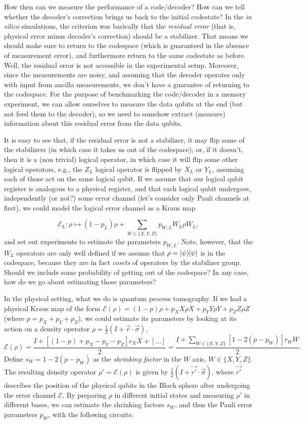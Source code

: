 \documentclass{article}
\begin{document}
How then can we measure the performance of a code/decoder? How can we tell whether the decoder's correction brings us back to the initial codestate? In the \textit{in silico} simulations, the criterion was basically that the \textit{residual error} (that is, physical error minus decoder's correction) should be a stabilizer. That means we should make sure to return to the codespace (which is guaranteed in the absence of measurement error), and furthermore return to the same codestate as before. Well, the residual error is not accessible in the experimental setup. Moreover, since the measurements are noisy, and assuming that the decoder operates only with input from ancilla measurements, we don't have a guarantee of returning to the codespace. For the purpose of benchmarking the code/decoder in a memory experiment, we can allow ourselves to measure the data qubits at the end (but not feed them to the decoder), so we need to somehow extract (measure) information about this residual error from the data qubits. 

It is easy to see that, if the residual error is not a stabilizer, it may flip some of the stabilizers (in which case it takes us out of the codespace), or, if it doesn't, then it is a (non trivial) logical operator, in which case it will flip some other logical operators, e.g., the $Z_L$ logical operator is flipped by $X_L$ or $Y_L$, assuming each of those act on the same logical qubit. If we assume that our logical qubit register is analogous to a physical register, and that each logical qubit undergoes, independently (or not?) some error channel (let's consider only Pauli channels at first), we could model the logical error channel as a Kraus map

$$
\mathcal{E}_L : \rho \mapsto (1-p_L) \rho + \sum\limits_{W\in \{X, Y, Z\}} p_{W, L} W_L \rho W_L, 
$$
and set out experiments to estimate the parameters $p_{W,L}$. Note, however, that the $W_L$ operators are only well defined if we assume that $\rho = \ketbra{\psi}$ is in the codespace, because they are in fact \textit{cosets} of operators by the stabilizer group. Should we include some probability of getting out of the codespace? In any case, how do we go about estimating those parameters?

In the physical setting, what we do is quantum process tomography. If we had a physical Kraus map of the form $\mathcal{E}(\rho) = (1-p)\rho + p_X X\rho X + p_Y Y\rho Y + p_Z Z\rho Z$ (where $p = p_X+p_Y+p_Z$), we could estimate its parameters by looking at its action on a density operator $\rho = \frac{1}{2}(I + \vec{r}\cdot\vec{\sigma})$, 
$$
\mathcal{E}(\rho) = \dfrac{I + [(1-p) + p_X - p_Y - p_Z] r_X X + [\dots]}{2} = \dfrac{I + \sum_{W\in\{X,Y,Z\}} [1 - 2(p - p_W)] r_W W}{2}. 
$$
Define $s_W = 1 - 2(p-p_W)$ as the \textit{shrinking factor} in the $W$ axis, $W \in \{X, Y, Z\}$. The resulting density operator $\rho' = \mathcal{E}(\rho)$ is given by $\frac{1}{2}(I + \vec{r'}\cdot\vec{\sigma})$, where $\vec{r'}$ describes the position of the physical qubits in the Bloch sphere after undergoing the error channel $\mathcal{E}$. By preparing $\rho$ in different initial states and measuring $\rho'$ in different bases, we can estimate the shrinking factors $s_W$, and thus the Pauli error parameters $p_W$, with the following circuits:
\end{document}
